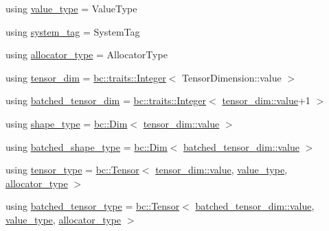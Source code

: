 \begin{DoxyCompactItemize}
\item 
using \hyperlink{structbc_1_1nn_1_1tensor__descriptor_a50cff589c12e4da21525c0ebb04dc54d}{value\+\_\+type} = Value\+Type
\item 
using \hyperlink{structbc_1_1nn_1_1tensor__descriptor_afc32b2c3143020f26bd9c50f530d399c}{system\+\_\+tag} = System\+Tag
\item 
using \hyperlink{structbc_1_1nn_1_1tensor__descriptor_aeca4d7720d1a19acea4d9166e3af80a3}{allocator\+\_\+type} = Allocator\+Type
\item 
using \hyperlink{structbc_1_1nn_1_1tensor__descriptor_ae2cb1d96346b40d67764bd9daf726f74}{tensor\+\_\+dim} = \hyperlink{structbc_1_1traits_1_1Integer}{bc\+::traits\+::\+Integer}$<$ Tensor\+Dimension\+::value $>$
\item 
using \hyperlink{structbc_1_1nn_1_1tensor__descriptor_a063563a739f9139ae7bc654d2c5aa983}{batched\+\_\+tensor\+\_\+dim} = \hyperlink{structbc_1_1traits_1_1Integer}{bc\+::traits\+::\+Integer}$<$ \hyperlink{structbc_1_1traits_1_1Integer_a853b05936b98e64c79163395c3624e32}{tensor\+\_\+dim\+::value}+1 $>$
\item 
using \hyperlink{structbc_1_1nn_1_1tensor__descriptor_ac71505e6bbfeba13ce3c0ba9bc0b404d}{shape\+\_\+type} = \hyperlink{structbc_1_1Dim}{bc\+::\+Dim}$<$ \hyperlink{structbc_1_1traits_1_1Integer_a853b05936b98e64c79163395c3624e32}{tensor\+\_\+dim\+::value} $>$
\item 
using \hyperlink{structbc_1_1nn_1_1tensor__descriptor_a5791f524a799083405bc9dc0f9761e36}{batched\+\_\+shape\+\_\+type} = \hyperlink{structbc_1_1Dim}{bc\+::\+Dim}$<$ \hyperlink{structbc_1_1traits_1_1Integer_a853b05936b98e64c79163395c3624e32}{batched\+\_\+tensor\+\_\+dim\+::value} $>$
\item 
using \hyperlink{structbc_1_1nn_1_1tensor__descriptor_ae5e9727a4ae20a76ed4b87ed8c386468}{tensor\+\_\+type} = \hyperlink{namespacebc_a659391e47ab612be3ba6c18cf9c89159}{bc\+::\+Tensor}$<$ \hyperlink{structbc_1_1traits_1_1Integer_a853b05936b98e64c79163395c3624e32}{tensor\+\_\+dim\+::value}, \hyperlink{structbc_1_1nn_1_1tensor__descriptor_a50cff589c12e4da21525c0ebb04dc54d}{value\+\_\+type}, \hyperlink{structbc_1_1nn_1_1tensor__descriptor_aeca4d7720d1a19acea4d9166e3af80a3}{allocator\+\_\+type} $>$
\item 
using \hyperlink{structbc_1_1nn_1_1tensor__descriptor_a8220be14af61131bfc16d83eabe75022}{batched\+\_\+tensor\+\_\+type} = \hyperlink{namespacebc_a659391e47ab612be3ba6c18cf9c89159}{bc\+::\+Tensor}$<$ \hyperlink{structbc_1_1traits_1_1Integer_a853b05936b98e64c79163395c3624e32}{batched\+\_\+tensor\+\_\+dim\+::value}, \hyperlink{structbc_1_1nn_1_1tensor__descriptor_a50cff589c12e4da21525c0ebb04dc54d}{value\+\_\+type}, \hyperlink{structbc_1_1nn_1_1tensor__descriptor_aeca4d7720d1a19acea4d9166e3af80a3}{allocator\+\_\+type} $>$
\end{DoxyCompactItemize}


